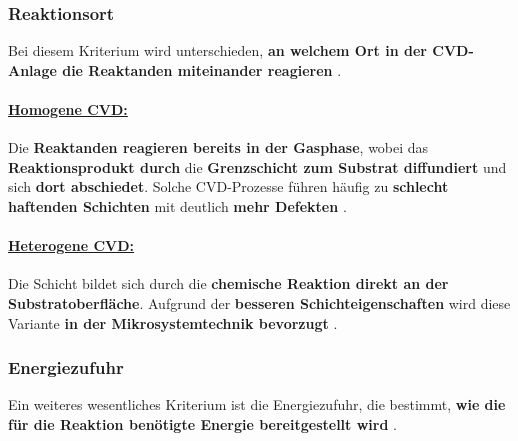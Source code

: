 \documentclass{article} %
\begin{document}
\vspace{1em}

\subsubsection{Reaktionsort} %

Bei diesem Kriterium wird unterschieden, \textbf{an welchem Ort in der CVD-Anlage die Reaktanden miteinander reagieren} \cite{keplinger2024CVD}.

\vspace{0.0em}

\paragraph{\uline{Homogene CVD:}} Die \textbf{Reaktanden reagieren bereits in der Gasphase}, wobei das \textbf{Reaktionsprodukt durch} die 
\textbf{Grenzschicht zum Substrat diffundiert} und sich \textbf{dort abschiedet}. Solche CVD-Prozesse führen häufig zu \textbf{schlecht haftenden Schichten} mit 
deutlich \textbf{mehr Defekten} \cite{keplinger2024CVD}.

\vspace{0.0em}

\paragraph{\uline{Heterogene CVD:}} Die Schicht bildet sich durch die \textbf{chemische Reaktion direkt an der Substratoberfläche}. Aufgrund der \textbf{besseren Schichteigenschaften} wird diese Variante \textbf{in der Mikrosystemtechnik bevorzugt} \cite{keplinger2024CVD}.





\vspace{1em}

\subsubsection{Energiezufuhr} %

Ein weiteres wesentliches Kriterium ist die Energiezufuhr, die bestimmt, \textbf{wie die für die Reaktion benötigte Energie bereitgestellt wird} \cite{keplinger2024CVD}.

\vspace{0.0em}
\end{document}
